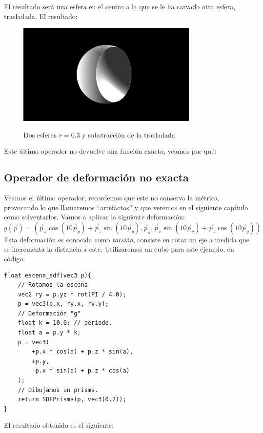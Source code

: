 El resultado será una esfera en el centro a la que se le ha carvado otra esfera, trasladada. El resultado:

\begin{figure}[H]
  \centering
  \captionsetup{justification=centering}%
  \includegraphics[width=0.8\textwidth]{secciones/imagenes/sdf/3d/sdf_substract_3d.png}\label{fig:sub3d}
  \caption{Dos esferas \(r=0.3\) y substracción de la trasladada}
\end{figure}

Este último operador no devuelve una función exacta, veamos por qué:

\subsection{Operador de deformación no exacta}

Veamos el último operador, recordemos que este no conserva la métrica, provocando lo que llamaremos \enquote{artefactos} y que veremos en el siguiente capítulo como solventarlos. Vamos a aplicar la siguiente deformación:
\[g(\Vec{p})=(
\Vec{p}_x \cos(10\Vec{p}_y) + \Vec{p}_z\sin(10\Vec{p}_y),
\Vec{p}_y,
\Vec{p}_x\sin(10\Vec{p}_y) + \Vec{p}_z\cos(10\Vec{p}_y)
)
\]
Esta deformación es conocida como \textit{torsión}, consiste en rotar un eje a medida que se incrementa la distancia a este. Utilizaremos un cubo para este ejemplo, en código:

\begin{lstlisting}
float escena_sdf(vec3 p){
    // Rotamos la escena
    vec2 ry = p.yz * rot(PI / 4.0);
    p = vec3(p.x, ry.x, ry.y);
    // Deformación "g"
    float k = 10.0; // periodo.
    float a = p.y * k;
    p = vec3(
    	+p.x * cos(a) + p.z * sin(a),
    	+p.y,
        -p.x * sin(a) + p.z * cos(a)
    );
	// Dibujamos un prisma.
    return SDFPrisma(p, vec3(0.2));
}
\end{lstlisting}

El resultado obtenido es el siguiente:

